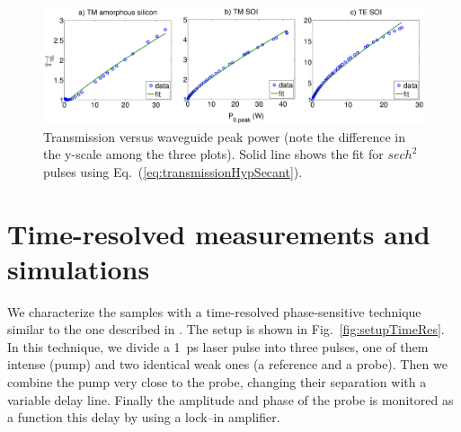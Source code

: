 \documentclass[10pt,letterpaper]{article}
\begin{document}



\begin{figure}[htb]
    \centering
    \includegraphics[width=1.0\textwidth]{imGamma_aSi_TM_TE}
      \caption{Transmission versus waveguide peak power (note the difference in the y-scale among the three plots). Solid line shows the fit for $ sech^2 $ pulses using Eq.~(\ref{eq:transmissionHypSecant}).}
    \label{fig:imGammaSamples}
\end{figure}



\section{Time-resolved measurements and simulations}
We characterize the samples with a time-resolved phase-sensitive technique similar to the one described in \cite{Vallaitis2008}. The setup is shown in Fig.~\ref{fig:setupTimeRes}. In this technique, we divide a 1~ps laser pulse into three pulses, one of them intense (pump) and two identical weak ones (a reference and a probe). Then we combine the pump very close to the probe, changing their separation with a variable delay line. Finally the amplitude and phase of the probe is monitored as a function this delay by using a lock--in amplifier.
\end{document}
